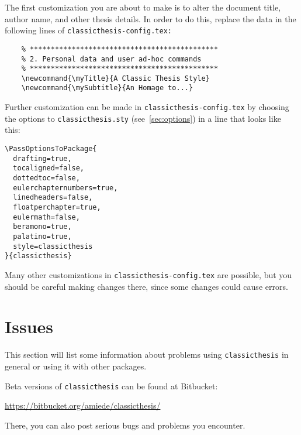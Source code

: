 The first customization you are about to make is to alter the document
title, author name, and other thesis details. In order to do this, replace
the data in the following lines of \texttt{classicthesis-config.tex:}%

\begin{lstlisting}
    % *********************************************
    % 2. Personal data and user ad-hoc commands
    % *********************************************
    \newcommand{\myTitle}{A Classic Thesis Style}
    \newcommand{\mySubtitle}{An Homage to...}
\end{lstlisting}

Further customization can be made in \texttt{classicthesis-config.tex}
by choosing the options to \texttt{classicthesis.sty}
(see~\autoref{sec:options}) in a line that looks like this:

\begin{lstlisting}
\PassOptionsToPackage{
  drafting=true,
  tocaligned=false,
  dottedtoc=false,
  eulerchapternumbers=true,
  linedheaders=false,
  floatperchapter=true,
  eulermath=false,
  beramono=true,
  palatino=true,
  style=classicthesis
}{classicthesis}
\end{lstlisting}

Many other customizations in \texttt{classicthesis-config.tex} are
possible, but you should be careful making changes there, since some
changes could cause errors.



\section{Issues}\label{sec:issues}
This section will list some information about problems using
\texttt{classic\-thesis} in general or using it with other packages.

Beta versions of \texttt{classicthesis} can be found at Bitbucket:
\begin{center}
    \url{https://bitbucket.org/amiede/classicthesis/}
\end{center}
There, you can also post serious bugs and problems you encounter.


